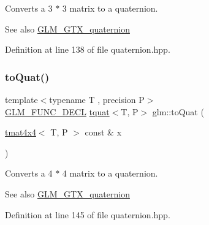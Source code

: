Converts a 3 $\ast$ 3 matrix to a quaternion.

\begin{DoxySeeAlso}{See also}
\mbox{\hyperlink{group__gtx__quaternion}{G\+L\+M\+\_\+\+G\+T\+X\+\_\+quaternion}} 
\end{DoxySeeAlso}


Definition at line 138 of file quaternion.\+hpp.

\mbox{\label{group__gtx__quaternion_ga808dd0f83ee8150db7e652313bde8eb2}} 
\subsubsection{\texorpdfstring{toQuat()}{toQuat()}\hspace{0.1cm}{\footnotesize\ttfamily [2/2]}}
{\footnotesize\ttfamily template$<$typename T , precision P$>$ \\
\mbox{\hyperlink{setup_8hpp_ab2d052de21a70539923e9bcbf6e83a51}{G\+L\+M\+\_\+\+F\+U\+N\+C\+\_\+\+D\+E\+CL}} \mbox{\hyperlink{structglm_1_1tquat}{tquat}}$<$T, P$>$ glm\+::to\+Quat (\begin{DoxyParamCaption}\item[{\mbox{\hyperlink{structglm_1_1tmat4x4}{tmat4x4}}$<$ T, P $>$ const \&}]{x }\end{DoxyParamCaption})}

Converts a 4 $\ast$ 4 matrix to a quaternion.

\begin{DoxySeeAlso}{See also}
\mbox{\hyperlink{group__gtx__quaternion}{G\+L\+M\+\_\+\+G\+T\+X\+\_\+quaternion}} 
\end{DoxySeeAlso}


Definition at line 145 of file quaternion.\+hpp.

